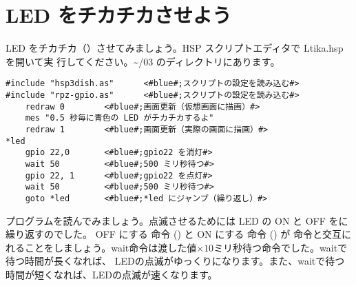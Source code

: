 \newpage
\section{LED をチカチカさせよう}

LED をチカチカ（）させてみましょう。HSP スクリプトエディタで Ltika.hsp を開いて実
行してください。\textasciitilde /03 のディレクトリにあります。\\

\begin{lstlisting}[caption=\textasciitilde/03/Ltika.hsp,label=Ltika.hsp]
#include "hsp3dish.as"		<#blue#;スクリプトの設定を読み込む#>
#include "rpz-gpio.as"		<#blue#;スクリプトの設定を読み込む#>
	redraw 0		<#blue#;画面更新（仮想画面に描画）#>
	mes "0.5 秒毎に青色の LED がチカチカするよ"
	redraw 1		<#blue#;画面更新（実際の画面に描画）#>
*led
	gpio 22,0		<#blue#;gpio22 を消灯#>
	wait 50 		<#blue#;500 ミリ秒待つ#>
	gpio 22, 1 		<#blue#;gpio22 を点灯#>
	wait 50 		<#blue#;500 ミリ秒待つ#>
	goto *led 		<#blue#;*led にジャンプ（繰り返し）#>
\end{lstlisting}

プログラムを読んでみましょう。点滅させるためには LED の ON と OFF をに繰り返すのでした。
OFF にする  命令 () と ON にする  命令 () が  命令と交互に
れることをしましょう。wait命令は渡した値$\times 10$ミリ秒待つ命令でした。waitで待つ時間が長くなれば、
LEDの点滅がゆっくりになります。また、waitで待つ時間が短くなれば、LEDの点滅が速くなります。

\begin{tcolorbox}[title=\useOmetoi]
	\begin{enumerate}
	\end{enumerate}
\end{tcolorbox}
